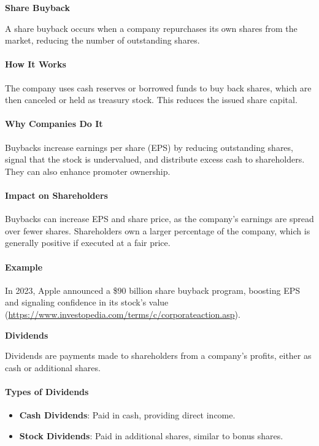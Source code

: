 \documentclass[12pt]{article}
\begin{document}
\textbf{Share Buyback}

A share buyback occurs when a company repurchases its own shares from the market, reducing the number of outstanding shares.

\paragraph{How It Works}
The company uses cash reserves or borrowed funds to buy back shares, which are then canceled or held as treasury stock. This reduces the issued share capital.

\paragraph{Why Companies Do It}
Buybacks increase earnings per share (EPS) by reducing outstanding shares, signal that the stock is undervalued, and distribute excess cash to shareholders. They can also enhance promoter ownership.

\paragraph{Impact on Shareholders}
Buybacks can increase EPS and share price, as the company's earnings are spread over fewer shares. Shareholders own a larger percentage of the company, which is generally positive if executed at a fair price.

\paragraph{Example}
In 2023, Apple announced a \$90 billion share buyback program, boosting EPS and signaling confidence in its stock's value (\url{https://www.investopedia.com/terms/c/corporateaction.asp}).

\textbf{Dividends}

Dividends are payments made to shareholders from a company's profits, either as cash or additional shares.

\paragraph{Types of Dividends}
\begin{itemize}
    \item \textbf{Cash Dividends}: Paid in cash, providing direct income.
    \item \textbf{Stock Dividends}: Paid in additional shares, similar to bonus shares.
\end{itemize}
\end{document}
